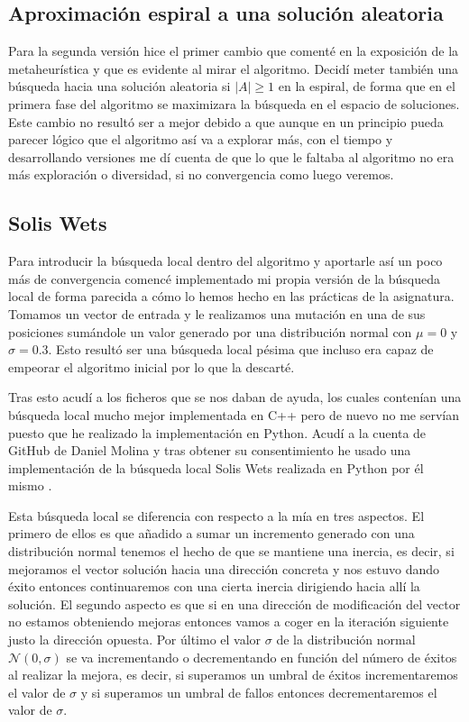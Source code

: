 \documentclass[12pt,a4paper]{article}
\begin{document}
	\subsection{Aproximación espiral a una solución aleatoria}
	
	Para la segunda versión hice el primer cambio que comenté en la exposición de la metaheurística y que es evidente al mirar el algoritmo. Decidí meter también una búsqueda hacia una solución aleatoria si $|A|\geq 1$ en la espiral, de forma que en el primera fase del algoritmo se maximizara la búsqueda en el espacio de soluciones. Este cambio no resultó ser a mejor debido a que aunque en un principio pueda parecer lógico que el algoritmo así va a explorar más, con el tiempo y desarrollando versiones me dí cuenta de que lo que le faltaba al algoritmo no era más exploración o diversidad, si no convergencia como luego veremos.
	
	\subsection{Solis Wets}
	
	Para introducir la búsqueda local dentro del algoritmo y aportarle así un poco más de convergencia comencé implementado mi propia versión de la búsqueda local de forma parecida a cómo lo hemos hecho en las prácticas de la asignatura. Tomamos un vector de entrada y le realizamos una mutación en una de sus posiciones sumándole un valor generado por una distribución normal con $\mu = 0$ y $\sigma = 0.3$. Esto resultó ser una búsqueda local pésima que incluso era capaz de empeorar el algoritmo inicial por lo que la descarté.
	
	Tras esto acudí a los ficheros que se nos daban de ayuda, los cuales contenían una búsqueda local mucho mejor implementada en C++ pero de nuevo no me servían puesto que he realizado la implementación en Python. Acudí a la cuenta de GitHub de Daniel Molina y tras obtener su consentimiento he usado una implementación de la búsqueda local Solis Wets realizada en Python por él mismo \cite{solisWetsDanielMolina}.
	
	Esta búsqueda local se diferencia con respecto a la mía en tres aspectos. El primero de ellos es que añadido a sumar un incremento generado con una distribución normal tenemos el hecho de que se mantiene una inercia, es decir, si mejoramos el vector solución hacia una dirección concreta y nos estuvo dando éxito entonces continuaremos con una cierta inercia dirigiendo hacia allí la solución. El segundo aspecto es que si en una dirección de modificación del vector no estamos obteniendo mejoras entonces vamos a coger en la iteración siguiente justo la dirección opuesta. Por último el valor $\sigma$ de la distribución normal $\mathcal{N}(0,\sigma)$ se va incrementando o decrementando en función del número de éxitos al realizar la mejora, es decir, si superamos un umbral de éxitos incrementaremos el valor de $\sigma$ y si superamos un umbral de fallos entonces decrementaremos el valor de $\sigma$. 
	
\end{document}
